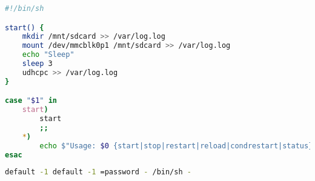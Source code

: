 \begin{lstlisting}[language=bash,caption=/etc/init.d/S99start]
#!/bin/sh

start() {
	mkdir /mnt/sdcard >> /var/log.log
	mount /dev/mmcblk0p1 /mnt/sdcard >> /var/log.log
	echo "Sleep"
	sleep 3
	udhcpc >> /var/log.log
}

case "$1" in
	start)
		start
		;;
	*)	
		echo $"Usage: $0 {start|stop|restart|reload|condrestart|status}"		
esac
\end{lstlisting}	


\begin{lstlisting}[language=bash,caption=user.tables]
default -1 default -1 =password - /bin/sh - 
\end{lstlisting}	


